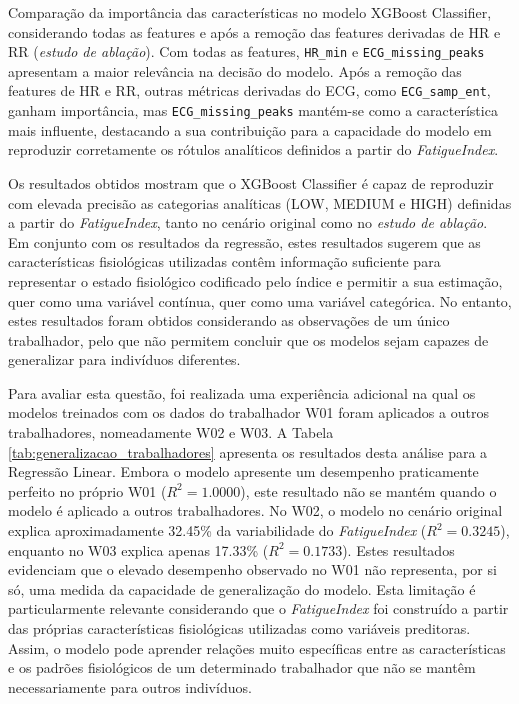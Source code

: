 Comparação da importância das características no modelo XGBoost Classifier, considerando todas as features e após a remoção das features derivadas de HR e RR (\textit{estudo de ablação}). Com todas as features, \texttt{HR\_min} e \texttt{ECG\_missing\_peaks} apresentam a maior relevância na decisão do modelo. Após a remoção das features de HR e RR, outras métricas derivadas do ECG, como \texttt{ECG\_samp\_ent}, ganham importância, mas \texttt{ECG\_missing\_peaks} mantém-se como a característica mais influente, destacando a sua contribuição para a capacidade do modelo em reproduzir corretamente os rótulos analíticos definidos a partir do \textit{FatigueIndex}.

Os resultados obtidos mostram que o XGBoost Classifier é capaz de reproduzir com elevada precisão as categorias analíticas (LOW, MEDIUM e HIGH) definidas a partir do \textit{FatigueIndex}, tanto no cenário original como no \textit{estudo de ablação}. Em conjunto com os resultados da regressão, estes resultados sugerem que as características fisiológicas utilizadas contêm informação suficiente para representar o estado fisiológico codificado pelo índice e permitir a sua estimação, quer como uma variável contínua, quer como uma variável categórica. No entanto, estes resultados foram obtidos considerando as observações de um único trabalhador, pelo que não permitem concluir que os modelos sejam capazes de generalizar para indivíduos diferentes.

Para avaliar esta questão, foi realizada uma experiência adicional na qual os modelos treinados com os dados do trabalhador W01 foram aplicados a outros trabalhadores, nomeadamente W02 e W03. A Tabela \ref{tab:generalizacao_trabalhadores} apresenta os resultados desta análise para a Regressão Linear. Embora o modelo apresente um desempenho praticamente perfeito no próprio W01 ($R^2 = 1.0000$), este resultado não se mantém quando o modelo é aplicado a outros trabalhadores. No W02, o modelo no cenário original explica aproximadamente 32.45\% da variabilidade do \textit{FatigueIndex} ($R^2 = 0.3245$), enquanto no W03 explica apenas 17.33\% ($R^2 = 0.1733$). Estes resultados evidenciam que o elevado desempenho observado no W01 não representa, por si só, uma medida da capacidade de generalização do modelo. Esta limitação é particularmente relevante considerando que o \textit{FatigueIndex} foi construído a partir das próprias características fisiológicas utilizadas como variáveis preditoras. Assim, o modelo pode aprender relações muito específicas entre as características e os padrões fisiológicos de um determinado trabalhador que não se mantêm necessariamente para outros indivíduos.

